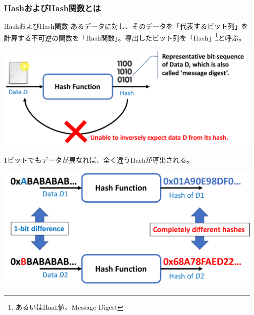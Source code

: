 \documentclass[12pt,dvipdfmx]{beamer}
\begin{document}
\begin{frame}
\frametitle{HashおよびHash関数とは}
\begin{block}{\small HashおよびHash関数}
あるデータに対し、そのデータを「代表するビット列」を計算する不可逆の関数を「Hash関数」。導出したビット列を「Hash」\footnote[frame]{あるいはHash値、Message Digest}と呼ぶ。
\end{block}
\begin{center}
\includegraphics[width=0.8\linewidth]{Figs/hash-flow01.pdf}
\end{center}
\end{frame}

\begin{frame}
 1ビットでもデータが異なれば、全く違うHashが導出される。
\begin{center}
 \includegraphics[width=0.8\linewidth]{Figs/hash-flow02.pdf}
\end{center}
\end{frame}
\end{document}
